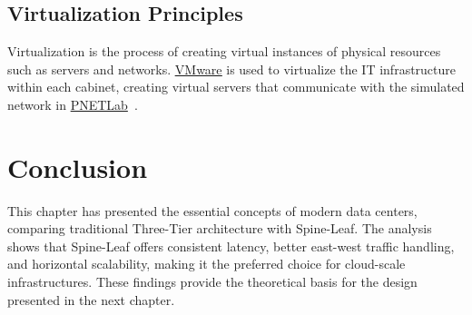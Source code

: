 \subsection{Virtualization Principles}
Virtualization is the process of creating virtual instances of physical resources such as servers and networks. \hyperref[def:vmwareworkstation]{\underline{VMware}} is used to virtualize the IT infrastructure within each cabinet, creating virtual servers that communicate with the simulated network in \hyperref[def:pnetlab]{PNETLab}~\cite{virtu}.

\section{Conclusion}
This chapter has presented the essential concepts of modern data centers, comparing traditional Three-Tier architecture with Spine-Leaf. The analysis shows that Spine-Leaf offers consistent latency, better east-west traffic handling, and horizontal scalability, making it the preferred choice for cloud-scale infrastructures. These findings provide the theoretical basis for the design presented in the next chapter.